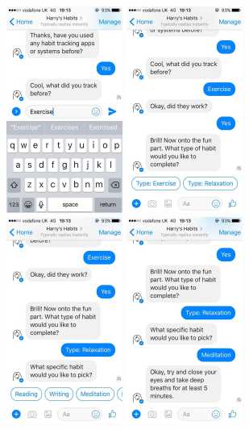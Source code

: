 \begin{figure}[H]
  \newline
  \newline
  \includegraphics[width=1.5in]{resources/design/process/5.jpg}
  \hspace{10px}
  \includegraphics[width=1.5in]{resources/design/process/6.jpg}
  \hspace{10px}
  \includegraphics[width=1.5in]{resources/design/process/7.jpg}
  \hspace{10px}
  \includegraphics[width=1.5in]{resources/design/process/8.jpg}

\end{figure}

